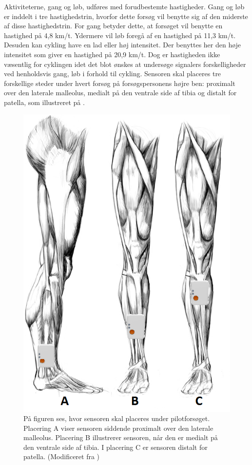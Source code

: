 Aktiviteterne, gang og løb, udføres med forudbestemte hastigheder. \newline
Gang og løb er inddelt i tre hastighedstrin, hvorfor dette forsøg vil benytte sig af den miderste af disse hastighedstrin. For gang betyder dette, at forsøget vil benytte en hastighed på 4,8 km/t. Ydermere vil løb foregå af en hastighed på 11,3 km/t. Desuden kan cykling have en lad eller høj intensitet. Der benyttes her den høje intensitet som giver en hastighed på 20,9 km/t. Dog er hastigheden ikke væsentlig for cyklingen idet det blot ønskes at undersøge signalers forskelligheder ved henholdsvis gang, løb i forhold til cykling. \citep{Miles 2007} \newline
Sensoren skal placeres tre forskellige steder under hvert forsøg på forsøgspersonens højre ben: proximalt over den laterale malleolus, medialt på den ventrale side af tibia og distalt for patella, som illustreret på .
\begin{figure}[H]
	\centering
	\includegraphics[scale=0.6]{figures/qBilag/Sensor_placering.png}
	\caption{På figuren ses, hvor sensoren skal placeres under pilotforsøget. Placering A viser sensoren siddende proximalt over den laterale malleolus. Placering B illustrerer sensoren, når den er medialt på den ventrale side af tibia. I placering C er sensoren distalt for patella. (Modificeret fra \cite{Perna2016,Shimmer2016})}
	\label{fig:sensor_placering}
\end{figure}


